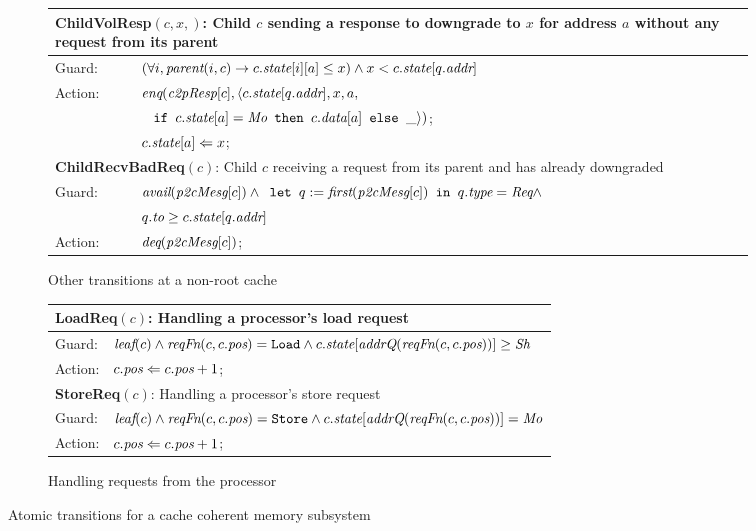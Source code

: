 \begin{figure}
\begin{subfigure}{\textwidth}
\centering
\begin{tabular}{|ll|}
\hline
\multicolumn{2}{|p{\textwidth}|}{\textbf{ChildVolResp}$(c, x, )$: Child $c$ sending a response to downgrade to $x$ for address $a$ without any request from its parent}\\
\hline
Guard: & $(\forall i, \textit{parent}(i, c) \rightarrow c.\textit{state}[i][a] \le x) \wedge x < c.\textit{state}[q.\textit{addr}]$\\
\hline
Action: & $\textit{enq}(\textit{c2pResp}[c], \langle c.\textit{state}[q.\textit{addr}], x, a,$\\
& $\;\;\;%
\myif c.\state[a] = \Mo \mythen c.\data[a] \myelse \_\rangle)$;\\
& $c.\textit{state}[a] \Leftarrow x$;\\
\hline
\hline
\multicolumn{2}{|p{\textwidth}|}{\textbf{ChildRecvBadReq}$(c)$: Child $c$ receiving a request from its parent and has already downgraded}\\
\hline
Guard: & 
$\textit{avail}(\textit{p2cMesg}[c]) \wedge \texttt{ let } q := \textit{first}(\textit{p2cMesg}[c]) \texttt{ in } q.\textit{type} = \textit{Req} \wedge$\\
& $q.\textit{to} \ge c.\textit{state}[q.\textit{addr}]$\\
\hline
Action: & $\textit{deq}(\textit{p2cMesg}[c])$;\\
\hline
\end{tabular}
\caption{Other transitions at a non-root cache}
\end{subfigure}

\begin{subfigure}{\textwidth}
\centering
\begin{tabular}{|ll|}
\hline
\multicolumn{2}{|l|}{\textbf{LoadReq}$(c)$: Handling a processor's load request}\\
\hline
Guard: & $\textit{leaf}(c) \wedge \textit{reqFn}(c, c.\textit{pos}) = \texttt{Load} \wedge c.\textit{state}[\textit{addrQ}(\textit{reqFn}(c, c.\textit{pos}))] \ge \textit{Sh}$\\
\hline
Action:& $c.\textit{pos} \Leftarrow c.\textit{pos} + 1$;\\
\hline
\hline
\multicolumn{2}{|l|}{\textbf{StoreReq}$(c)$: Handling a processor's store request}\\
\hline
Guard: & $\textit{leaf}(c) \wedge \textit{reqFn}(c, c.\textit{pos}) = \texttt{Store} \wedge c.\textit{state}[\textit{addrQ}(\textit{reqFn}(c, c.\textit{pos}))] = \textit{Mo}$\\
\hline
Action:& $c.\textit{pos} \Leftarrow c.\textit{pos} + 1$;\\
\hline
\end{tabular}
\caption{Handling requests from the processor}
\end{subfigure}
\caption{Atomic transitions for a cache coherent memory subsystem}
\label{trans}
\end{figure}

